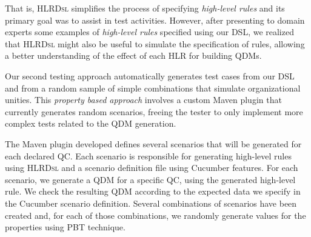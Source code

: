 \documentclass[twocolumn]{bmcart}%
\newcommand{\callers}{\emph{high-level rules}\xspace}
\newcommand{\shc}{HLR\xspace}
\newcommand{\hlrdsl}{\textsc{HLRDsl}\xspace}
\begin{document}
That is, \hlrdsl simplifies the process of specifying \callers and its primary goal was to assist in
test activities. However, after presenting to domain experts some examples of \callers specified using our DSL,
we realized that \hlrdsl might also be useful to simulate the specification of rules,
allowing a better understanding of the effect of each \shc for building QDMs.

Our second testing approach automatically generates test cases from our DSL and from a random sample of simple combinations that simulate organizational unities. This \emph{property based approach} involves a custom Maven plugin that currently generates random scenarios, freeing the tester to only implement more complex tests related to the QDM generation. 



The Maven plugin developed defines several scenarios that will be generated for each declared QC. Each scenario is responsible for generating high-level rules using \hlrdsl and a scenario definition file using Cucumber features. For each scenario, we generate a QDM for a specific QC, using the generated high-level rule.
We check the resulting QDM according to the expected data we specify in the Cucumber scenario definition. Several combinations of scenarios have been created and, for each of those combinations, we randomly generate values for the properties using PBT technique.
\end{document}
